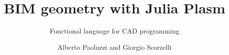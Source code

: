 \documentclass[graybox,envcountchap,sectrefs]{svmono}
\theoremstyle{plain}%
\theoremstyle{definition}
\begin{document}
\author{Alberto Paoluzzi and Giorgio Scorzelli}
\title{BIM geometry with Julia Plasm}
\subtitle{Functional language for CAD programming}
\maketitle



\frontmatter%






\tableofcontents

%


\mainmatter%

















%




\backmatter%


\printindex

\end{document}
